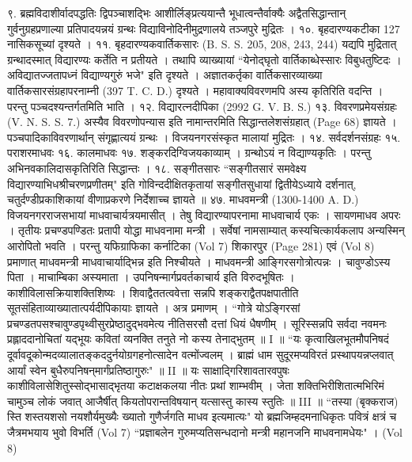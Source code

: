 ९. ब्रह्मविदाशीर्वादपद्धतिः
द्विपञ्चाशद्भिः आशीर्लिङ्प्रत्ययान्तै भूधात्वन्तैर्वाक्यैः अद्वैतसिद्धान्तान् गुर्वनुग्रहप्रणाल्या प्रतिपादयन्नयं ग्रन्थः विद्याविनोदिनीमुद्रणालये तञ्जपुरे मुद्रितः ।
१०. बृहदारण्यकटीका 127 नासिकसूच्यां दृश्यते ।
११. बृहदारण्यकवार्तिकसारः (B. S. S. 205, 208, 243, 244)
यद्यपि मुद्रितात् ग्रन्थादस्मात् विद्यारण्यः कर्तेति न प्रतीयते । तथापि व्याख्यायां ``येनोद्घृतो वार्तिकाब्धेस्सारः विबुधतुष्टिदः । अविद्यातज्जतापध्नं विद्याण्यगुरुं भजे" इति दृश्यते । अज्ञातकर्तृका वार्तिकसारव्याख्या वार्तिकसारसंग्रहापरनाम्नी (397 T. C. D.) दृश्यते । महावाक्यविवरणमपि अस्य कृतिरिति वदन्ति । परन्तु पञ्चदश्यन्तर्गतमिति भाति ।
१२. विद्यारत्नदीपिका (2992 G. V. B. S.)
१३. विवरणप्रमेयसंग्रहः (V. N. S. S. 7.)
अस्यैव विवरणोपन्यास इति नामान्तरमिति सिद्धान्तलेशसंग्रहात् (Page 68) ज्ञायते । पञ्चपादिकाविवरणार्थान् संगृह्णात्ययं ग्रन्थः । विजयनगरसंस्कृत मालायां मुद्रितः ।
१४. सर्वदर्शनसंग्रहः १५. पराशरमाधवः १६. कालमाधवः १७. शङ्करदिग्विजयकाव्याम् । ग्रन्थोऽयं न विद्याण्यकृतिः । परन्तु अभिनवकालिदासकृतिरिति सिद्धान्तः ।
१८. सङ्गीतसारः
``सङ्गीतसारं समवेक्ष्य विद्यारण्याभिधश्रीचरणप्रणीतम्" इति गोविन्ददीक्षितकृतायां सङ्गीतसुधायां द्वितीयेऽध्याये दर्शनात्, चतुर्दण्डीप्रकाशिकायां वीणाप्रकरणे निर्देशाच्च ज्ञायते ॥
४७. माधवमन्त्री (1300-1400 A. D.)
विजयनगरराजसभायां माधवाचार्यत्रयमासीत् । तेषु विद्यारण्यापरनामा माधवाचार्य एकः । सायणमाधव अपरः । तृतीयः प्रचण्डपण्डितः प्रतापी योद्धा माधवनामा मन्त्री । सर्वेषां नामसाम्यात् कस्यचित्कार्यकलाप अन्यस्मिन् आरोपितो भवति । परन्तु यफिग्राफिका कर्नाटिका (Vol 7) शिकारपुर (Page 281) एवं (Vol 8) प्रमाणात् माधवमन्त्री माधवाचार्याद्भिन्न इति निश्चीयते ।
माधवमन्त्री आङ्गिरसगोत्रोत्पन्नः । चावुण्डोऽस्य पिता । माचाम्बिका अस्यमाता । उपनिषन्मार्गप्रवर्तकाचार्य इति विरुदभूषितः । काशीविलासक्रियाशक्तिशिष्यः । शिवाद्वैततत्ववेत्ता सन्नपि शङ्कराद्वैतपक्षपातीति सूतसंहिताव्याख्यातात्पर्यदीपिकायाः ज्ञायते । अत्र प्रमाणम्  ।  ``गोत्रे योऽङ्गिरसां प्रचण्डतपसश्चावुण्डपृथ्वीसुरप्रेष्ठादुद्भवमेत्य नीतिसरसौ दत्तां धियं धैषणीम् । सूरिस्सन्नपि सर्वदा नवमनः प्रह्लाददानोचितां यद्भूयः कवितां व्यनक्ति तनुते नो कस्य तेनाद्भुतम् ॥ I ॥ ``यः कृत्वाखिलभूतमौपनिषदं दूर्वावदूकोन्मदव्यालातङ्कददुर्नयोग्रगहनोत्सादेन वत्मोंज्वलम् । ब्राह्मं धाम सुदूरमप्यविरतं प्रस्थापयन्नप्लवात् आर्यां स्वेन बुधैरुपनिषन्‌मार्गंप्रतिष्ठागुरुः" ॥ II ॥ यः साक्षाद्गिरिशावतारवपुषः काशीविलासेशितुस्सोद्भासाद्भृतया कटाक्षकलया नीतः प्रथां शाम्भवीम् । जेता शक्तिभिरीशितात्मभिरिमं चामुञ्च लोकं जवात् आजैर्षीत् कियतोपरान्तविषयान् यत्सास्तु कास्य स्तुतिः ॥ III ॥ ``तस्या (बृक्कराज) स्ति शस्तयशसो नयशौर्यमुख्यैः ख्यातो गुणैर्जगति माधव इत्यमात्यः" यो ब्रह्मजिम्हदमनाधिकृतः पवित्रं क्षत्रं च जैत्रमभयाय भुवो विभर्ति (Vol 7) ``प्रज्ञाबलेन गुरुमप्यतिसन्धदानो मन्त्री महानजनि माधवनामधेयः" । (Vol 8)
